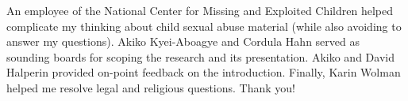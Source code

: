 \documentclass[authorversion,nonacm,screen]{acmart}
\begin{document}
\begin{abstract}

\end{abstract}


\maketitle









\begin{acks}
An employee of the National Center for Missing and Exploited Children helped
complicate my thinking about child sexual abuse material (while also avoiding to
answer my questions). Akiko Kyei-Aboagye and Cordula Hahn served as sounding
boards for scoping the research and its presentation. Akiko and David Halperin
provided on-point feedback on the introduction. Finally, Karin Wolman helped me
resolve legal and religious questions. Thank you!
\end{acks}





\appendix






\end{document}
